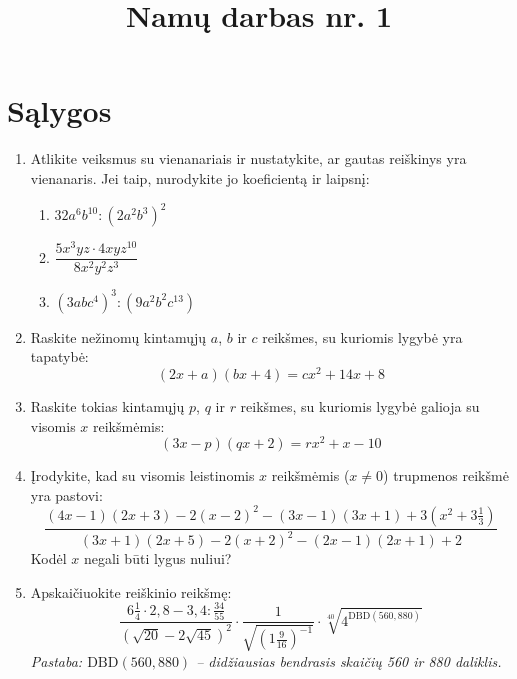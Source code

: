 \documentclass[12pt, a4paper]{article}
\title{\textbf{Namų darbas nr. 1}}
\date{}
\begin{document}
\maketitle

\section{Sąlygos}

\begin{enumerate}[label=\textbf{\arabic* užduotis.}, leftmargin=*]
    \item Atlikite veiksmus su vienanariais ir nustatykite, ar gautas reiškinys yra vienanaris. Jei taip, nurodykite jo koeficientą ir laipsnį:
    \begin{enumerate}[label=\alph*)]
        \item $32a^6 b^{10} : (2a^2 b^3)^2$
        \item $\dfrac{5x^3 y z \cdot 4xyz^{10}}{8x^2 y^2 z^3}$
        \item $(3abc^4)^3 : (9a^2 b^2 c^{13})$
    \end{enumerate}

    \item Raskite nežinomų kintamųjų $a$, $b$ ir $c$ reikšmes, su kuriomis lygybė yra tapatybė:
    \[
    (2x + a)(bx + 4) = cx^2 + 14x + 8
    \]

    \item Raskite tokias kintamųjų $p$, $q$ ir $r$ reikšmes, su kuriomis lygybė galioja su visomis $x$ reikšmėmis:
    \[
    (3x - p)(qx + 2) = rx^2 + x - 10
    \]

    \item Įrodykite, kad su visomis leistinomis $x$ reikšmėmis ($x \neq 0$) trupmenos reikšmė yra pastovi:
    \[
    \frac{(4x - 1)(2x + 3) - 2(x - 2)^2 - (3x - 1)(3x + 1) + 3\left(x^2 + 3\frac{1}{3}\right)}{(3x + 1)(2x + 5) - 2(x + 2)^2 - (2x - 1)(2x + 1) + 2}
    \]
    Kodėl $x$ negali būti lygus nuliui?  
    \item Apskaičiuokite reiškinio reikšmę:
    \[
    \frac{6\frac{1}{4} \cdot 2{,}8 - 3{,}4 : \frac{34}{55}}{(\sqrt{20} - 2\sqrt{45})^2} \cdot \frac{1}{\sqrt{\left(1\frac{9}{16}\right)^{-1}}} \cdot \sqrt[40]{4^{\text{DBD}(560, 880)}}
    \]
    \textit{Pastaba: $\text{DBD}(560, 880)$ – didžiausias bendrasis skaičių 560 ir 880 daliklis.}


\end{enumerate}
\end{document}
